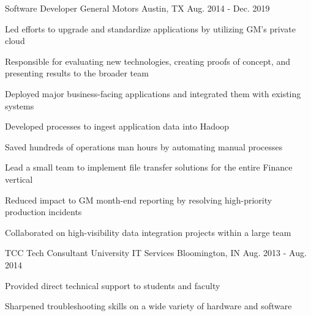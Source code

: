 \begin{cventries}
  \cventry
    {Software Developer} %
    {General Motors} %
    {Austin, TX} %
    {Aug. 2014 - Dec. 2019} %
    {
      \begin{cvitems} %
        \item {Led efforts to upgrade and standardize applications by utilizing GM's private cloud}
         \item {Responsible for evaluating new technologies, creating proofs of concept, and presenting results to the broader team} 
         \item {Deployed major business-facing applications and integrated them with existing systems}
         \item {Developed processes to ingest application data into Hadoop}
         \item {Saved hundreds of operations man hours by automating manual processes}
         \item {Lead a small team to implement file transfer solutions for the entire Finance vertical}
         \item {Reduced impact to GM month-end reporting by resolving high-priority production incidents}
         \item {Collaborated on high-visibility data integration projects within a large team}
      \end{cvitems}
    }

  \cventry
    {TCC Tech Consultant} %
    {University IT Services} %
    {Bloomington, IN} %
    {Aug. 2013 - Aug. 2014} %
    {
      \begin{cvitems} %
        \item {Provided direct technical support to students and faculty}
        \item {Sharpened troubleshooting skills on a wide variety of hardware and software}
      \end{cvitems}
    }

\end{cventries}
